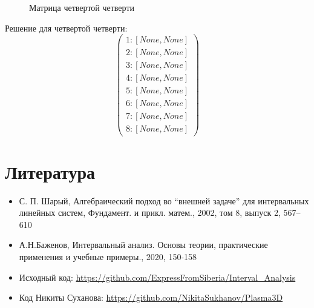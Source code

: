 \documentclass{article}
\begin{document}
\begin{figure}[h]
\caption{Матрица четвертой четверти}
\label{fig:image}
\end{figure}

Решение для четвертой четверти:
\begin{equation*}
\begin{pmatrix}
1 : [ None , None ] \\
2 : [ None , None ] \\
3 : [ None , None ] \\
4 : [ None , None ] \\ 
5 : [ None , None ] \\ 
6 : [ None , None ] \\ 
7 : [ None , None ] \\
8 : [ None , None ]
\end{pmatrix}
\end{equation*}

\newpage

\section{Литература}
\begin{itemize}
  \item С. П. Шарый, Алгебраический подход во “внешней задаче” для интервальных линейных систем, Фундамент. и прикл. матем., 2002, том 8, выпуск 2, 567–610
  \item А.Н.Баженов, Интервальный анализ. Основы теории, практические применения и учебные примеры.,
  2020, 150-158
  \item Исходный код: \url{https://github.com/ExpressFromSiberia/Interval_Analysis}
  \item Код Никиты Суханова: \url{https://github.com/NikitaSukhanov/Plasma3D}
\end{itemize}
\end{document}
